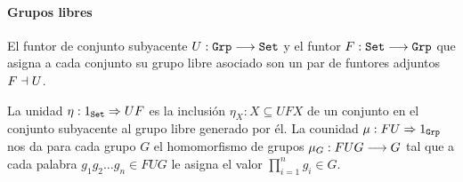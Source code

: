 \paragraph{Grupos libres}
El funtor de conjunto subyacente $U : \texttt{Grp}\longrightarrow \texttt{Set}$ y el funtor
$F : \texttt{Set}\longrightarrow \texttt{Grp}$ que asigna a cada conjunto su grupo libre asociado
son un par de funtores adjuntos $F \dashv U$.

La unidad $\eta : 1_{\texttt{Set}}\Rightarrow UF$ es la inclusión
$\eta_X : X \subseteq UFX$ de un conjunto en el conjunto subyacente
al grupo libre generado por él. La counidad
$\mu : FU\Rightarrow 1_{\texttt{Grp}}$ nos da para cada grupo $G$
el homomorfismo de grupos $\mu_G : FUG\longrightarrow G$
tal que a cada palabra
$g_1g_2\ldots g_n \in FUG$ le asigna el valor $\prod_{i=1}^n g_i \in G$.
